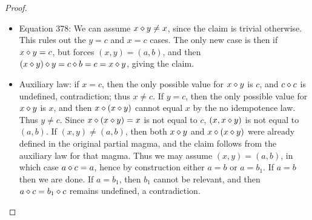 \begin{proof}
\begin{itemize}
  \item Equation 378:  We can assume $x \diamond y \neq x$, since the claim is trivial otherwise.  This rules out the $y=c$ and $x=c$ cases.  The only new case is then if $x \diamond y = c$, but forces $(x,y) = (a,b)$, and then $(x \diamond y) \diamond y = c \diamond b = c = x \diamond y$, giving the claim.
  \item Auxiliary law: if $x=c$, then the only possible value for $x \diamond y$ is $c$, and $c \diamond c$ is undefined, contradiction; thus $x \neq c$.  If $y = c$, then the only possible value for $x \diamond y$ is $x$, and then $x \diamond (x \diamond y)$ cannot equal $x$ by the no idempotence law.  Thus $y \neq c$.  Since $x \diamond (x \diamond y) = x$ is not equal to $c$, $(x,x \diamond y)$ is not equal to $(a,b)$.  If $(x,y) \neq (a,b)$, then both $x \diamond y$ and $x \diamond (x \diamond y)$ were already defined in the original partial magma, and the claim follows from the auxiliary law for that magma.  Thus we may assume $(x,y) = (a,b)$, in which case $a \diamond c = a$, hence by construction either $a=b$ or $a=b_1$.  If $a=b$ then we are done.  If $a = b_1$, then $b_1$ cannot be relevant, and then $a \diamond c = b_1 \diamond c$ remains undefined, a contradiction.
\end{itemize}


\end{proof}
